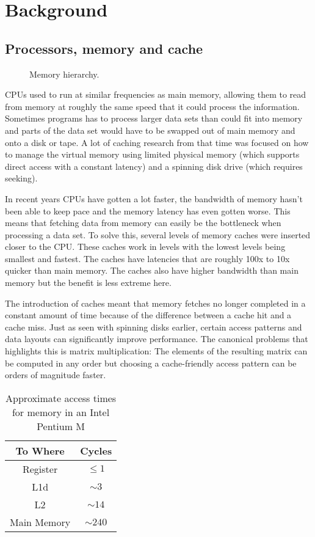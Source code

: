 \documentclass[a4paper,oneside]{memoir}
\begin{document}
\chapter{Background}
\section{Processors, memory and cache}

\begin{figure}
  \centering
  
  \caption{Memory hierarchy.}
\end{figure}

CPUs used to run at similar frequencies as main memory, allowing them to read
from memory at roughly the same speed that it could process the information.
Sometimes programs has to process larger data sets than could fit into memory
and parts of the data set would have to be swapped out of main memory and onto
a disk or tape. A lot of caching research from that time was focused on how to
manage the virtual memory using limited physical memory (which supports direct
access with a constant latency) and a spinning disk drive (which requires seeking).

In recent years CPUs have gotten a lot faster, the bandwidth of memory
hasn't been able to keep pace and the memory latency has even gotten worse. This
means that fetching data from memory can easily be the bottleneck when processing
a data set. To solve this, several levels of memory caches were inserted closer
to the CPU. These caches work in levels with the lowest levels being smallest
and fastest. The caches have latencies that are roughly 100x to 10x quicker
than main memory. The caches also have higher bandwidth than main memory but
the benefit is less extreme here.

The introduction of caches meant that memory fetches no longer completed in a
constant amount of time because of the difference between a cache hit and
a cache miss. Just as seen with spinning disks earlier, certain access patterns
and data layouts can significantly improve performance. The canonical problems
that highlights this is matrix multiplication: The elements of the resulting
matrix can be computed in any order but choosing a cache-friendly access pattern
can be orders of magnitude faster.

\begin{table}
  \centering
  \begin{tabular}{c | c}
    To Where & Cycles \\ \hline
    Register & $\le 1$ \\
    L1d & $\sim 3$ \\
    L2 & $\sim 14$ \\
    Main Memory & $\sim 240$
  \end{tabular}
  \caption{Approximate access times for memory in an Intel Pentium M}
\end{table}
\end{document}
